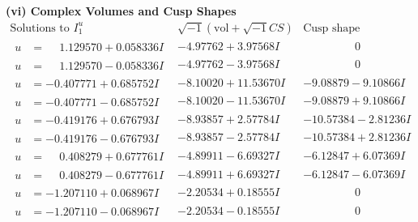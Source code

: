\documentclass[1p]{elsarticle_modified}
\theoremstyle{definition}
\newcommand{\I}{\sqrt{-1}}
\begin{document}
\newpage\flushleft \textbf{(vi) Complex Volumes and Cusp Shapes}
$$\begin{array}{c|c|c}  
\text{Solutions to }I^u_{1}& \I (\text{vol} + \sqrt{-1}CS) & \text{Cusp shape}\\
 \hline 
\begin{aligned}
u &= \phantom{-}1.129570 + 0.058336 I\end{aligned}
 & -4.97762 + 3.97568 I & \phantom{-0.000000 } 0 \\ \hline\begin{aligned}
u &= \phantom{-}1.129570 - 0.058336 I\end{aligned}
 & -4.97762 - 3.97568 I & \phantom{-0.000000 } 0 \\ \hline\begin{aligned}
u &= -0.407771 + 0.685752 I\end{aligned}
 & -8.10020 + 11.53670 I & -9.08879 - 9.10866 I \\ \hline\begin{aligned}
u &= -0.407771 - 0.685752 I\end{aligned}
 & -8.10020 - 11.53670 I & -9.08879 + 9.10866 I \\ \hline\begin{aligned}
u &= -0.419176 + 0.676793 I\end{aligned}
 & -8.93857 + 2.57784 I & -10.57384 - 2.81236 I \\ \hline\begin{aligned}
u &= -0.419176 - 0.676793 I\end{aligned}
 & -8.93857 - 2.57784 I & -10.57384 + 2.81236 I \\ \hline\begin{aligned}
u &= \phantom{-}0.408279 + 0.677761 I\end{aligned}
 & -4.89911 - 6.69327 I & -6.12847 + 6.07369 I \\ \hline\begin{aligned}
u &= \phantom{-}0.408279 - 0.677761 I\end{aligned}
 & -4.89911 + 6.69327 I & -6.12847 - 6.07369 I \\ \hline\begin{aligned}
u &= -1.207110 + 0.068967 I\end{aligned}
 & -2.20534 + 0.18555 I & \phantom{-0.000000 } 0 \\ \hline\begin{aligned}
u &= -1.207110 - 0.068967 I\end{aligned}
 & -2.20534 - 0.18555 I & \phantom{-0.000000 } 0 \\ \hline\begin{aligned}

\end{aligned}
\end{array}$$
\end{document}
